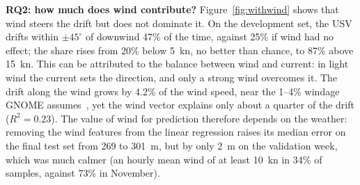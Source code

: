 \documentclass[sigconf]{acmart}
\begin{document}
\textbf{RQ2: how much does wind contribute?} Figure~\ref{fig:withwind} shows that wind steers the drift but does not dominate it. On the development set, the USV drifts within $\pm45^\circ$ of downwind 47\% of the time, against 25\% if wind had no effect; the share rises from 20\% below 5~kn, no better than chance, to 87\% above 15~kn. This can be attributed to the balance between wind and current: in light wind the current sets the direction, and only a strong wind overcomes it. The drift along the wind grows by 4.2\% of the wind speed, near the 1--4\% windage GNOME assumes~\cite{zelenke2012gnome}, yet the wind vector explains only about a quarter of the drift ($R^2 = 0.23$). The value of wind for prediction therefore depends on the weather: removing the wind features from the linear regression raises its median error on the final test set from 269 to 301~m, but by only 2~m on the validation week, which was much calmer (an hourly mean wind of at least 10~kn in 34\% of samples, against 73\% in November).
\end{document}
